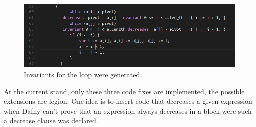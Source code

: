 \begin{figure}[H]
	\centering
	\includegraphics[width=1\textwidth]{img/indexChecked}
	\caption{Invariants for the loop were generated}
	\label{fig:indexInBound}
\end{figure}
At the current stand, only these three code fixes are implemented, the possible extensions are legion. One idea is to insert code that decreases a given expression when Dafny can't prove that an expression always decreases in a block were such a decrease clause was declared.\newline


